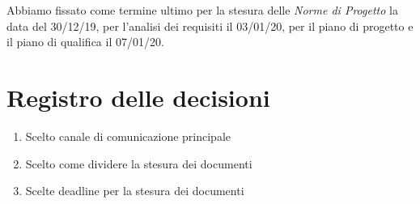 \documentclass{article}
\begin{document}
Abbiamo fissato come termine ultimo per la stesura delle \textit{Norme di Progetto} la data del 30/12/19, per l'analisi dei requisiti il 03/01/20, per il piano di progetto e il piano di qualifica il 07/01/20.

\newpage
\section{Registro delle decisioni}%
\label{sec:registro_delle_decisioni}

\begin{enumerate}
  \item Scelto canale di comunicazione principale
  \item Scelto come dividere la stesura dei documenti
  \item Scelte deadline per la stesura dei documenti
\end{enumerate}

\end{document}
